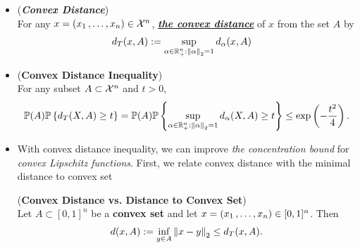 \documentclass[11pt]{article}
\begin{document}
\begin{itemize}
\item \begin{definition}(\textbf{\emph{Convex Distance}})\\
For any $x = (x_1 \,{,}\ldots{,}\, x_n)  \in {\mathcal X}^n$, \underline{\emph{\textbf{the convex distance}}} of $x$ from the set $A$ by
\begin{align*}
d_{T}(x, A) &:=\sup_{\alpha \in {\mathbb R}_{+}^{n}: \left\|\alpha\right\|_{2} = 1}d_{\alpha}(x, A)
\end{align*}

\end{definition}

\item \begin{theorem} (\textbf{Convex Distance Inequality}) \citep{boucheron2013concentration}\\
For any subset $A \subset {\mathcal X}^n$ and $t > 0$,
\begin{align}
{\mathbb P}(A){\mathbb P}\left\{d_{T}(X, A)  \ge t\right\} = {\mathbb P}(A){\mathbb P}\left\{\sup_{\alpha \in {\mathbb R}_{+}^{n}: \left\|\alpha\right\|_{2} = 1}d_{\alpha}(X, A) \ge t\right\} \le  \exp\left(-\frac{t^2}{4}\right).
\end{align}
\end{theorem}

\item With convex distance inequality, we can improve \emph{the  concentration bound} for \emph{convex Lipschitz functions}. First, we relate convex distance with the minimal distance to convex set
\begin{lemma} \label{lem: convex_dist_bound_dist_convex_set} (\textbf{Convex Distance vs. Distance to Convex Set}) \citep{boucheron2013concentration}\\
Let $A \subset [0, 1]^n$ be a \textbf{convex set} and let $x = (x_1 \,{,}\ldots{,}\, x_n)  \in [0,1]^n$. Then
\begin{align}
 d(x, A):= \inf_{y \in A}\left\|x - y\right\|_{2} \le d_{T}(x, A).  \label{ineqn: convex_distance_bound_for_dist_convex_set}
\end{align}
\end{lemma}


\end{itemize}
\end{document}
